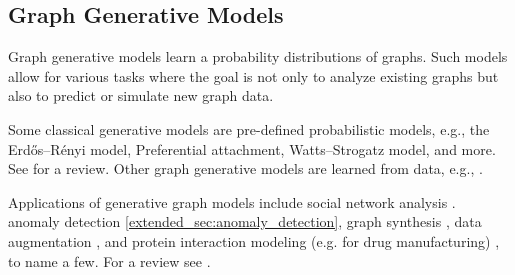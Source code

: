 \documentclass{article}
\theoremstyle{plain}
\theoremstyle{definition}
\theoremstyle{remark}
\newcommand{\ron}[1]{{{\textcolor{red}{\textbf{[Ron:} {#1}\textbf{]}}}}}
\begin{document}
\subsection{Graph Generative Models}
Graph generative models learn a probability distributions of graphs. %
 Such models allow for various tasks %
  where the goal is not only to analyze existing graphs but also to predict or simulate new graph data.

Some classical generative models are pre-defined probabilistic models, e.g., the Erdős–Rényi model, Preferential attachment, Watts–Strogatz model, and more. See \cite{newman2003classical_graph_generative}  for a review. Other graph generative models are learned from data, e.g., \cite{lee2019review, kipf2016variational,you2018graphrnn,bojchevski2018netgan}. %


Applications of generative graph models include social network analysis \cite{wang2018graphgan,grover2019graphite,harshvardhan2020comprehensive}.  anomaly detection \ref{extended_sec:anomaly_detection}, graph synthesis \cite{you2018graphrnn, guo2022systematic}, data augmentation \cite{ding2019data_augmentation}, and protein interaction modeling (e.g. for drug manufacturing) \cite{de2018molgan,ingraham2019generative}, to name a few.  For a review see \cite{ma2021comprehensive}.   
\end{document}
